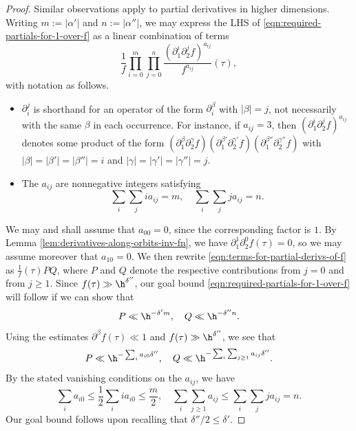 \begin{proof}
  Similar observations apply to partial derivatives in higher dimensions.  Writing $m := |\alpha '|$ and $n := |\alpha ''|$, we may express the LHS of \eqref{eqn:required-partials-for-1-over-f} as
  a linear combination of terms
  \begin{equation}\label{eqn:terms-for-partial-derivs-of-f}
    \frac{1}{f}
    \prod_{i=0}^{m}
    \prod_{j=0}^{n}
    \frac{
      (\partial_1^i \partial_2^j f)^{a_{i j}}
    }{f^{a_{i j}}}
    (\tau),
  \end{equation}
  with notation as follows.
  \begin{itemize}
  \item $\partial_i^j$ is shorthand for an operator of the form $\partial_i^{\beta}$ with $|\beta| = j$, not necessarily with the same $\beta$ in each occurrence.  For instance, if $a_{ij } = 3$, then $(\partial_1^i \partial_2^j f)^{a_{i j}}$ denotes some product of the form $(\partial_1^{\beta} \partial_2^{\gamma } f) (\partial_1^{\beta'} \partial_2^{\gamma'} f) (\partial_1^{\beta''} \partial_2^{\gamma'' } f)$ with $|\beta| = |\beta '| = |\beta ''| = i$ and $|\gamma| = |\gamma '| = |\gamma ''| = j$.
  \item The $a_{i j}$ are nonnegative integers satisfying
    \[
      \sum_{i} \sum_j i a_{i j} = m, \quad \sum_{i} \sum_j j a_{i j} = n.
    \]
  \end{itemize}
  We may and shall assume that $a_{0 0} = 0$, since the corresponding factor is $1$.  By Lemma \ref{lem:derivatives-along-orbits-inv-fn}, we have $\partial_1^1 \partial_2^0 f (\tau) = 0$, so we may assume moreover that $a_{1 0} = 0$.  We then rewrite \eqref{eqn:terms-for-partial-derivs-of-f} as $\frac{1}{f}(\tau) P Q$, where $P$ and $Q$ denote the respective contributions from $j = 0$ and from $j \geq 1$.  Since $f(\tau) \gg \h^{\delta ''}$, our goal bound \eqref{eqn:required-partials-for-1-over-f} will follow if we can show that
  \[
    P \ll \h^{- \delta ' m}, \quad Q \ll \h^{ - \delta '' n}.
  \]
  Using the estimates $\partial^\beta f(\tau) \ll 1$ and $f(\tau) \gg \h^{\delta ''}$, we see that
  \[
    P \ll \h^{- \sum_i a_{i 0} \delta ''}, \quad Q \ll \h^{- \sum_i \sum_{j \geq 1} a_{i j} \delta ''}.
  \]
  By the stated vanishing conditions on the $a_{i j}$, we have
  \[
    \sum_i a_{i 0} \leq \frac{1}{2} \sum_i i a_{i 0} \leq \frac{m}{2}, \quad \sum_i \sum_{j \geq 1} a_{i j} \leq \sum_i \sum_j j a_{i j} = n.
  \]
  Our goal bound follows upon recalling that $\delta ''/2 \leq \delta '$.
\end{proof}

